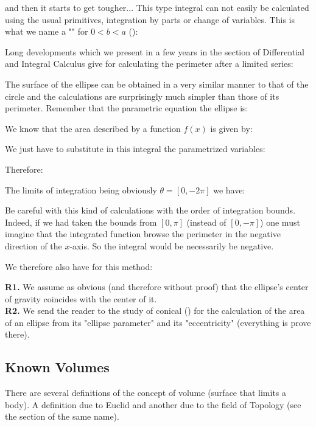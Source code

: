 {	and then it starts to get tougher... This type integral can not easily be calculated using the usual primitives, integration by parts or change of variables. This is what we name a "" for $0<b<a$ ():
	
	Long developments which we present in a few years in the section of Differential and Integral Calculus give for calculating the perimeter after a limited series:
	
	The surface of the ellipse can be obtained in a very similar manner to that of the circle and the calculations are surprisingly much simpler than those of its perimeter. Remember that the parametric equation the ellipse is:
	
	We know that the area described by a function $f (x)$ is given by:
	
	We just have to substitute in this integral the parametrized variables:
	
	Therefore:
	
	The limits of integration being obviously $\theta=[0,-2\pi]$ we have:
	
	\begin{tcolorbox}[title=Remark,colframe=black,arc=10pt]
	Be careful with this kind of calculations with the order of integration bounds. Indeed, if we had taken the bounds from $[0,\pi]$ (instead of $[0,-\pi]$) one must imagine that the integrated function browse the perimeter in the negative direction of the $x$-axis. So the integral would be necessarily be negative.
	\end{tcolorbox}
	We therefore also have for this method:
	
	\begin{tcolorbox}[title=Remarks,colframe=black,arc=10pt]
	\textbf{R1.} We assume as obvious (and therefore without proof) that the ellipse's center of gravity coincides with the center of it.\\
	
	\textbf{R2.} We send the reader to the study of conical () for the calculation of the area of an ellipse from its "ellipse parameter" and its "eccentricity" (everything is prove there).
	\end{tcolorbox}	
	
	\subsection{Known Volumes}
	There are several definitions of the concept of volume (surface that limits a body). A definition due to Euclid and another due to the field of Topology (see the section of the same name).
	
}
